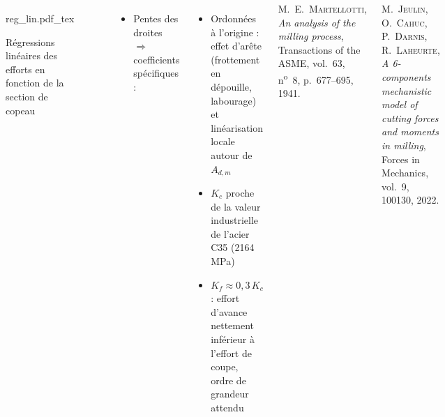 \documentclass{style/presentation}
\begin{document}
\begin{frame}

    \begin{columns}[c]
        \begin{figure}
            \centering
            {\fontsize{4.5pt}{5pt}\selectfont
                \def\svgwidth{\textwidth}
                {reg_lin.pdf_tex}}
            \caption{Régressions linéaires des efforts en fonction de la section de copeau}
        \end{figure}

        \begin{itemize}
            \item Pentes des droites $\Rightarrow$ coefficients spécifiques :
        \end{itemize}
        \vspace{1mm}
        \hfill
        \hfill
        \vspace{1mm}
        \begin{itemize}
            \item Ordonnées à l'origine : \alert{effet d'arête} (frottement en dépouille, labourage) et linéarisation locale autour de $A_{d,m}$
            \item $K_c$ \alert{proche de la valeur industrielle} de l'acier C35 (\num{2164}\,MPa)
            \item $K_f \approx 0{,}3\,K_c$ : effort d'avance nettement inférieur à l'effort de coupe, ordre de grandeur attendu
        \end{itemize}
        \vspace{2mm}
        {\footnotesize\color{jvgris} M.~E.~\textsc{Martellotti}, \emph{An analysis of the milling process}, Transactions of the ASME, vol.~63, n\textsuperscript{o}~8, p.~677--695, 1941.\par
        M.~\textsc{Jeulin}, O.~\textsc{Cahuc}, P.~\textsc{Darnis}, R.~\textsc{Laheurte}, \emph{A 6-components mechanistic model of cutting forces and moments in milling}, Forces in Mechanics, vol.~9, 100130, 2022.\par}
    \end{columns}
\end{frame}
\end{document}
